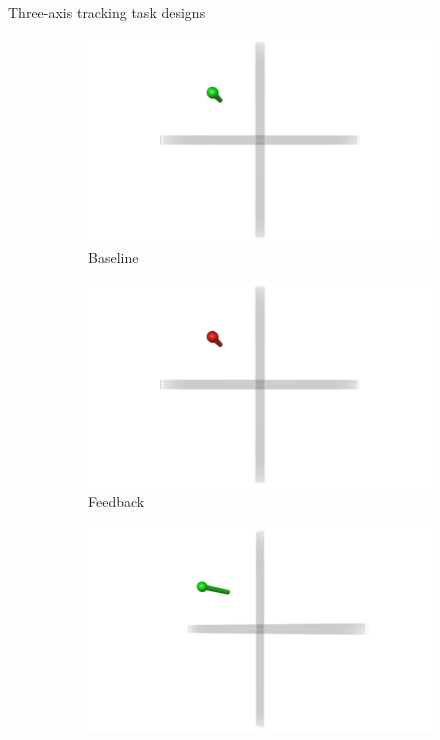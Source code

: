 \documentclass[10pt]{beamer}
\begin{document}
\begin{frame}[fragile]{Three-axis tracking task designs}
  \begin{figure}
    \begin{center}
      \begin{subfigure}{0.45\linewidth}
        \includegraphics[width=\linewidth]{../img/Baseline.png}
        \caption{Baseline}
      \end{subfigure}\hfill
      \begin{subfigure}{0.45\linewidth}
        \includegraphics[width=\linewidth]{../img/Color.png}
        \caption{Feedback}
      \end{subfigure}\hfill
      \begin{subfigure}{0.45\linewidth}
        \includegraphics[width=\linewidth]{../img/Angled.png}

\end{subfigure}
\end{center}
\end{figure}
\end{frame}
\end{document}
